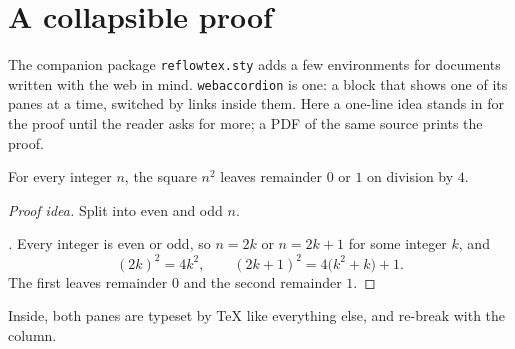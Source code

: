 \section*{A collapsible proof}
The companion package \texttt{reflowtex.sty} adds a few environments for
documents written with the web in mind. \texttt{webaccordion} is one: a block
that shows one of its panes at a time, switched by links inside them. Here a
one-line idea stands in for the proof until the reader asks for more; a PDF
of the same source prints the proof.

\begin{theorem}\label{thm:demo-sq}
For every integer $n$, the square $n^2$ leaves remainder $0$ or $1$ on division
by $4$.
\end{theorem}
\begin{webaccordion}
\begin{webpane}[collapsed]
\noindent\textit{Proof idea.} Split into even and odd $n$.
\end{webpane}
\begin{webpane}[expanded]
\begin{proof}[\proofname{}]
Every integer is even or odd, so $n = 2k$ or $n = 2k+1$ for some integer $k$,
and
\[
  (2k)^2 = 4k^2,
  \qquad
  (2k+1)^2 = 4\bigl(k^2+k\bigr) + 1 .
\]
The first leaves remainder $0$ and the second remainder $1$.
\end{proof}
\end{webpane}
\end{webaccordion}
Inside, both panes are typeset by \TeX{} like everything else, and re-break
with the column.

